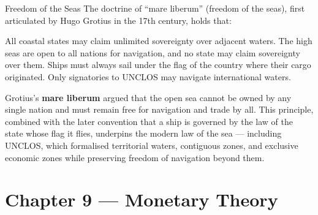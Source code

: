 \begin{question}[type=mc]{Freedom of the Seas}
The doctrine of ``mare liberum'' (freedom of the seas), first articulated by
Hugo Grotius in the 17th century, holds that:
\begin{choices}
  \choice        All coastal states may claim unlimited sovereignty over
                 adjacent waters.
  \correctchoice The high seas are open to all nations for navigation, and no
                 state may claim sovereignty over them.
  \choice        Ships must always sail under the flag of the country where
                 their cargo originated.
  \choice        Only signatories to UNCLOS may navigate international
                 waters.
  
\end{choices}
\begin{solution}
  Grotius's \textbf{mare liberum} argued that the open sea cannot be owned
  by any single nation and must remain free for navigation and trade by all.
  This principle, combined with the later convention that a ship is governed
  by the law of the state whose flag it flies, underpins the modern law of
  the sea --- including UNCLOS, which formalised territorial waters,
  contiguous zones, and exclusive economic zones while preserving freedom of
  navigation beyond them.
\end{solution}
\end{question}


\section{Chapter 9 — Monetary Theory}

